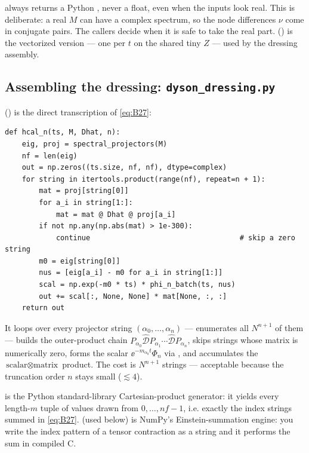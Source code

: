 \begin{gotcha}
 always returns a Python , never a float, even when
the inputs look real. This is deliberate: a real $M$ can have a complex
spectrum, so the node differences $\nu$ come in conjugate pairs. The callers
decide when it is safe to take the real part. 
() is the vectorized version --- one
 per $t$ on the shared tiny $Z$ --- used by the dressing assembly.
\end{gotcha}

\subsection{Assembling the dressing: \texttt{dyson\_dressing.py}}

 () is the direct
transcription of \eqref{eq:B27}:

\begin{lstlisting}
def hcal_n(ts, M, Dhat, n):
    eig, proj = spectral_projectors(M)
    nf = len(eig)
    out = np.zeros((ts.size, nf, nf), dtype=complex)
    for string in itertools.product(range(nf), repeat=n + 1):
        mat = proj[string[0]]
        for a_i in string[1:]:
            mat = mat @ Dhat @ proj[a_i]
        if not np.any(np.abs(mat) > 1e-300):
            continue                                   # skip a zero string
        m0 = eig[string[0]]
        nus = [eig[a_i] - m0 for a_i in string[1:]]
        scal = np.exp(-m0 * ts) * phi_n_batch(ts, nus)
        out += scal[:, None, None] * mat[None, :, :]
    return out
\end{lstlisting}

It loops over every projector string $(\alpha_{0},\dots,\alpha_{n})$ ---
 enumerates all $N^{n+1}$ of
them --- builds the outer-product chain
$P_{\alpha_{0}}\widehat{\mathcal{D}}P_{\alpha_{1}}\cdots\widehat{\mathcal{D}}P_{\alpha_{n}}$,
skips strings whose matrix is numerically zero, forms the scalar
$\ee^{-m_{\alpha_{0}}t}\Phi_{n}$ via , and accumulates the
$\text{scalar}\otimes\text{matrix}$ product. The cost is $N^{n+1}$ strings ---
acceptable because the truncation order $n$ stays small ($\lesssim4$).

\begin{defn}
 is the Python standard-library
Cartesian-product generator: it yields every length-$m$ tuple of values drawn
from $0,\dots,nf-1$, i.e. exactly the index strings summed in \eqref{eq:B27}.
 (used below) is NumPy's Einstein-summation engine: you write the
index pattern of a tensor contraction as a string and it performs the sum in
compiled C.
\end{defn}

